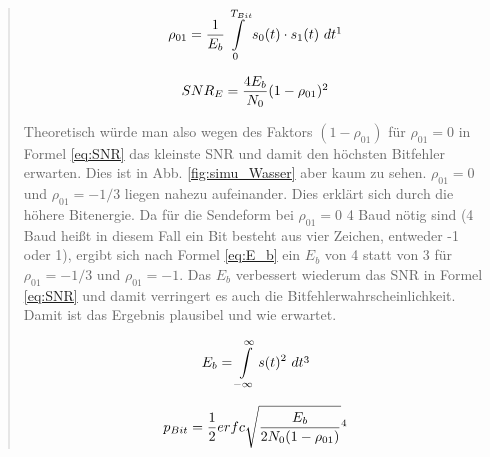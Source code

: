 \begin{quote}
       \vspace{2em}
  
  
    \begin{equation}
	     \begin{split}
		\rho_{01}=\frac{1}{E_{b}} \int\limits_{0}^{T_{Bit}}  s_{0}(t) \cdot s_{1}(t)  \ dt
           \footnotemark
	     \end{split}
    \end{equation} 
     \label{eq:rho01}
    
    \begin{equation}
	     \begin{split}
		SNR_{E}=\frac{4E_{b}}{N_{0}}(1-\rho_{01})
           \footnotemark
	     \end{split}
    \end{equation}  
     \label{eq:SNR}
           
    Theoretisch würde man also wegen des Faktors $(1-\rho_{01})$ für $\rho_{01}=0$ in Formel \ref{eq:SNR} das kleinste
    SNR und damit den höchsten Bitfehler erwarten. Dies ist in Abb.   \ref{fig:simu_Wasser} aber kaum zu sehen.
    $\rho_{01}=0$ und $\rho_{01}=-1/3$ liegen nahezu aufeinander. Dies erklärt sich durch die höhere Bitenergie. Da für die
    Sendeform bei $\rho_{01}=0$ 4 Baud nötig sind (4 Baud heißt in diesem Fall ein Bit besteht aus vier Zeichen,
    entweder -1 oder 1), ergibt sich nach Formel \ref{eq:E_b} ein $E_{b}$ von 4 statt von 3 für $\rho_{01} = -1/3$ und
    $\rho_{01}= -1$. Das $E_{b}$ verbessert wiederum das SNR in Formel \ref{eq:SNR} und damit verringert es auch die
    Bitfehlerwahrscheinlichkeit. Damit ist das Ergebnis plausibel und wie erwartet. 
    
    \begin{equation}
        \begin{split}
            E_{b}= \int\limits_{-\infty}^{\infty} s(t)^2 \ dt
        \end{split}
        \footnotemark
    \end{equation}  
    \label{eq:E_b}
    
    \begin{equation}
	     \begin{split}
		p_{Bit}=\frac{1}{2}erfc  \sqrt{\frac{E_{b}}{2N_{0}(1-\rho_{01})}}
           \footnotemark
	     \end{split}
    \end{equation}  
	 \label{eq:p_bit}
        

\end{quote}
